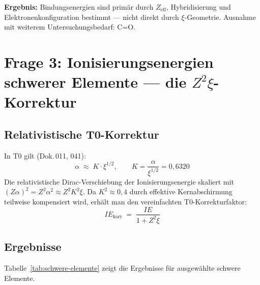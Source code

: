 \textbf{Ergebnis:} Bindungsenergien sind primär durch $Z_\mathrm{eff}$,
Hybridisierung und Elektronenkonfiguration bestimmt — nicht direkt durch
$\xi$-Geometrie. Ausnahme mit weiterem Untersuchungsbedarf: C=O.

\section{Frage 3: Ionisierungsenergien schwerer Elemente — die \texorpdfstring{$Z^2\xi$}{Z²ξ}-Korrektur}
\label{sec:schwere-elemente}

\subsection{Relativistische T0-Korrektur}
\label{subsec:rel-korrektur}

In T0 gilt (Dok.\,011, 041):
\begin{equation}
  \alpha \;\approx\; K \cdot \xi^{1/2}, \qquad K = \frac{\alpha}{\xi^{1/2}} = 0{,}6320
\end{equation}
Die relativistische Dirac-Verschiebung der Ionisierungsenergie skaliert mit
$(Z\alpha)^2 = Z^2 \alpha^2 \approx Z^2 K^2 \xi$.
Da $K^2 \approx 0{,}4$ durch effektive Kernabschirmung teilweise kompensiert
wird, erhält man den vereinfachten T0-Korrekturfaktor:
\begin{equation}
  \boxed{IE_\mathrm{korr} \;=\; \frac{IE}{1 + Z^2 \xi}}
  \label{eq:IE-korr}
\end{equation}

\subsection{Ergebnisse}
\label{subsec:ergebnisse-schwer}

Tabelle~\ref{tab:schwere-elemente} zeigt die Ergebnisse für ausgewählte
schwere Elemente.

\begin{table}[htbp]
\centering
\caption{T0-Korrektur der Ionisierungsenergien für $Z > 54$}
\label{tab:schwere-elemente}
\end{table}

